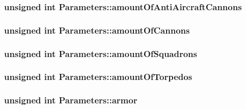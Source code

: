 \subsubsection[{\texorpdfstring{amount\+Of\+Anti\+Aircraft\+Cannons}{amountOfAntiAircraftCannons}}]{\setlength{\rightskip}{0pt plus 5cm}unsigned int Parameters\+::amount\+Of\+Anti\+Aircraft\+Cannons}\hypertarget{struct_parameters_a7e763517fc70161d9edb3dd6290457bb}{}\label{struct_parameters_a7e763517fc70161d9edb3dd6290457bb}
\subsubsection[{\texorpdfstring{amount\+Of\+Cannons}{amountOfCannons}}]{\setlength{\rightskip}{0pt plus 5cm}unsigned int Parameters\+::amount\+Of\+Cannons}\hypertarget{struct_parameters_a13d11f0501e41cb7aa7bbb9757c5b5da}{}\label{struct_parameters_a13d11f0501e41cb7aa7bbb9757c5b5da}
\subsubsection[{\texorpdfstring{amount\+Of\+Squadrons}{amountOfSquadrons}}]{\setlength{\rightskip}{0pt plus 5cm}unsigned int Parameters\+::amount\+Of\+Squadrons}\hypertarget{struct_parameters_a1217bb1ae5b1f5a5be2fbb91d1e27f33}{}\label{struct_parameters_a1217bb1ae5b1f5a5be2fbb91d1e27f33}
\subsubsection[{\texorpdfstring{amount\+Of\+Torpedos}{amountOfTorpedos}}]{\setlength{\rightskip}{0pt plus 5cm}unsigned int Parameters\+::amount\+Of\+Torpedos}\hypertarget{struct_parameters_a53565b1bc98a61d79bd1f3c3b972e660}{}\label{struct_parameters_a53565b1bc98a61d79bd1f3c3b972e660}
\subsubsection[{\texorpdfstring{armor}{armor}}]{\setlength{\rightskip}{0pt plus 5cm}unsigned int Parameters\+::armor}\hypertarget{struct_parameters_a630c021422dbf1bdbbbacb269ed1a4fd}{}\label{struct_parameters_a630c021422dbf1bdbbbacb269ed1a4fd}
